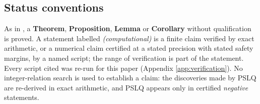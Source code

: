 \documentclass[11pt]{amsart}
\numberwithin{equation}{section}
\theoremstyle{plain}
\theoremstyle{definition}
\theoremstyle{remark}
\newcommand{\PaperI}{\cite{SchmidtI}}
\begin{document}
\subsection*{Status conventions}
As in \PaperI, a \textbf{Theorem}, \textbf{Proposition}, \textbf{Lemma} or
\textbf{Corollary} without qualification is proved.  A statement labelled
\emph{(computational)} is a finite claim verified by exact arithmetic, or
a numerical claim certified at a stated precision with stated safety
margins, by a named script; the range of verification is part of the
statement.  Every script cited was re-run for this paper (Appendix
\ref{app:verification}).  No integer-relation search is used to establish
a claim: the discoveries made by PSLQ are re-derived in exact arithmetic,
and PSLQ appears only in certified \emph{negative} statements.
\end{document}
